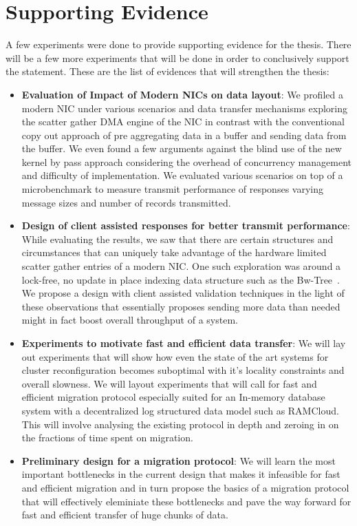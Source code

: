 \section{Supporting Evidence}
A few experiments were done to provide supporting evidence for the thesis. There will be 
a few more experiments that will be done in order to conclusively support the statement. These are the 
list of evidences that will strengthen the thesis:

\begin{itemize}
\item{\textbf{Evaluation of Impact of Modern NICs on data layout}}: We profiled a modern NIC under various 
scenarios and data transfer mechanisms exploring the scatter gather DMA engine of the NIC in contrast
with the conventional copy out approach of pre aggregating data in a buffer and sending data from the buffer.
We even found a few arguments against the blind use of the new kernel by pass approach considering the overhead
of concurrency management and difficulty of implementation. We evaluated various scenarios on top of a
microbenchmark to measure transmit performance of responses varying message sizes and number of records
transmitted.
\item{\textbf{Design of client assisted responses for better transmit performance}}: While evaluating the results,
we saw that there are certain structures and circumstances that can uniquely take advantage of the hardware limited 
scatter gather entries of a modern NIC. One such exploration was around a lock-free, no update in place 
indexing data structure such as the Bw-Tree~\cite{bw-tree}. We propose a design with client assisted 
validation techniques in the light of these observations that essentially proposes sending more data than 
needed might in fact boost overall throughput of a system.
\item{\textbf{Experiments to motivate fast and efficient data transfer}}: We will lay out experiments that will 
show how even the state of the art systems for cluster reconfiguration becomes suboptimal with it's locality
constraints and overall slowness. We will layout experiments that will call for fast and efficient migration protocol
especially suited for an In-memory database system with a decentralized log structured data model such as RAMCloud.
This will involve analysing the existing protocol in depth and zeroing in on the fractions of time spent on migration.
\item{\textbf{Preliminary design for a migration protocol}}: We will learn the most important bottlenecks in the current design
that makes it infeasible for fast and efficient migration and in turn propose the basics of a migration protocol that 
will effectively eleminiate these bottlenecks and pave the way forward for fast and efficient transfer of huge chunks of data.
\end{itemize}


